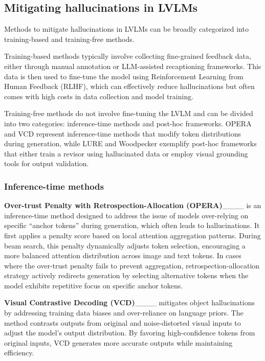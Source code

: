 \subsection{Mitigating hallucinations in LVLMs}\label{subsec-mitigating}
Methods to mitigate hallucinations in LVLMs can be broadly categorized into training-based and training-free methods. 

Training-based methods typically involve collecting fine-grained feedback data, either through manual annotation or LLM-assisted recaptioning frameworks. This data is then used to fine-tune the model using Reinforcement Learning from Human Feedback (RLHF), which can effectively reduce hallucinations but often comes with high costs in data collection and model training. 

Training-free methods do not involve fine-tuning the LVLM and can be divided into two categories: inference-time methods and post-hoc frameworks. OPERA and VCD represent inference-time methods that modify token distributions during generation, while LURE and Woodpecker exemplify post-hoc frameworks that either train a revisor using hallucinated data or employ visual grounding tools for output validation.

\subsubsection{Inference-time methods}\label{subsubsec-inference}
\textbf{Over-trust Penalty with Retrospection-Allocation (OPERA)}____ is an inference-time method designed to address the issue of models over-relying on specific \textquotedblleft anchor tokens\textquotedblright{} during generation, which often leads to hallucinations. It first applies a penalty score based on local attention aggregation patterns. During beam search, this penalty dynamically adjusts token selection, encouraging a more balanced attention distribution across image and text tokens. In cases where the over-trust penalty fails to prevent aggregation, retrospection-allocation strategy actively redirects generation by selecting alternative tokens when the model exhibits repetitive focus on specific anchor tokens.


\textbf{Visual Contrastive Decoding (VCD)}____ mitigates object hallucinations by addressing training data biases and over-reliance on language priors. The method contrasts outputs from original and noise-distorted visual inputs to adjust the model's output distribution. By favoring high-confidence tokens from original inputs, VCD generates more accurate outputs while maintaining efficiency.

